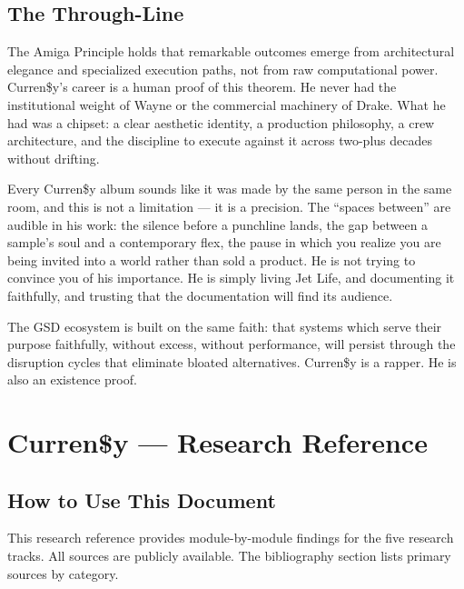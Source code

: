\documentclass[11pt,letterpaper]{article}
\newcommand{\stageheader}[2]{%
  \noindent\colorbox{#2}{\makebox[\textwidth][l]{%
    \textcolor{white}{\bfseries\sffamily\hspace{6pt}#1\hspace{6pt}}}}%
  \vspace{0.5em}\par%
}
\begin{document}
\subsection{The Through-Line}

The Amiga Principle holds that remarkable outcomes emerge from architectural elegance and specialized execution paths, not from raw computational power. Curren\$y's career is a human proof of this theorem. He never had the institutional weight of Wayne or the commercial machinery of Drake. What he had was a chipset: a clear aesthetic identity, a production philosophy, a crew architecture, and the discipline to execute against it across two-plus decades without drifting.

Every Curren\$y album sounds like it was made by the same person in the same room, and this is not a limitation — it is a precision. The ``spaces between'' are audible in his work: the silence before a punchline lands, the gap between a sample's soul and a contemporary flex, the pause in which you realize you are being invited into a world rather than sold a product. He is not trying to convince you of his importance. He is simply living Jet Life, and documenting it faithfully, and trusting that the documentation will find its audience.

The GSD ecosystem is built on the same faith: that systems which serve their purpose faithfully, without excess, without performance, will persist through the disruption cycles that eliminate bloated alternatives. Curren\$y is a rapper. He is also an existence proof.

\newpage

\stageheader{STAGE 2 --- RESEARCH REFERENCE}{secondary}

\section{Curren\$y — Research Reference}

\subsection{How to Use This Document}

This research reference provides module-by-module findings for the five research tracks. All sources are publicly available. The bibliography section lists primary sources by category.
\end{document}
